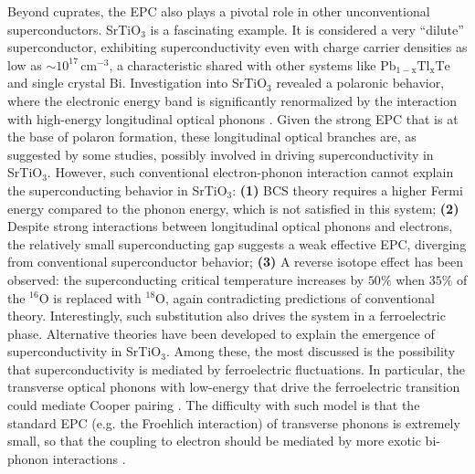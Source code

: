 \documentclass[11pt]{article}
\begin{document}
Beyond cuprates, the EPC also plays a pivotal role in other unconventional superconductors. 
SrTiO$_{3}$ is a fascinating example. It is considered a very ``dilute'' superconductor, exhibiting
superconductivity even with charge carrier densities as low as $\sim 10^{17}\,\mathrm{cm^{-3}}$\cite{schooley_superconductivity_1964,lin_fermi_2013}, a characteristic shared with other systems like $\mathrm{Pb_{1-x}Tl_{x}Te}$\cite{known} and single crystal $\mathrm{Bi}$\cite{prakash_evidence_2017}. 
Investigation into SrTiO$_{3}$ revealed a polaronic behavior, where the electronic energy band is significantly renormalized by the interaction with high-energy longitudinal optical phonons \cite{swartz_polaronic_2018, geondzhian_large_2020}.
Given the strong EPC that is at the base of polaron formation, these longitudinal optical branches are, as suggested by some studies\cite{gastiasoro_supercondutivity_2020}, possibly involved in driving superconductivity in SrTiO$_{3}$.
However, such conventional electron-phonon interaction cannot explain the superconducting behavior in SrTiO$_{3}$: 
\textbf{(1)} BCS theory requires a higher Fermi energy compared to the phonon energy, which is not satisfied in this system;
\textbf{(2)} Despite strong interactions between longitudinal optical phonons and electrons, the relatively small superconducting gap suggests a weak effective EPC, diverging from conventional superconductor behavior\cite{swartz_polaronic_2018}; 
\textbf{(3)} A reverse isotope effect has been observed: the superconducting critical temperature increases by $50\%$  when $35\%$ of the ${}^{16}\mathrm{O}$ is replaced with ${}^{18}\mathrm{O}$\cite{stucky_isotope_2016}, again contradicting predictions of conventional theory. Interestingly, such substitution also drives the system in a ferroelectric phase\cite{stucky_isotope_2016}.
Alternative theories have been developed to explain the emergence of superconductivity in SrTiO$_{3}$. Among these, the most discussed is the possibility that superconductivity is mediated by ferroelectric fluctuations. In particular, the transverse optical phonons with low-energy that drive the ferroelectric transition could mediate Cooper pairing \cite{gastiasoro_supercondutivity_2020}. The difficulty with such model is that the standard EPC (e.g. the Froehlich interaction) of transverse phonons is extremely small, so that the coupling to electron should be mediated by more exotic bi-phonon interactions \cite{gastiasoro_phonon-mediated_2019}.
\end{document}
